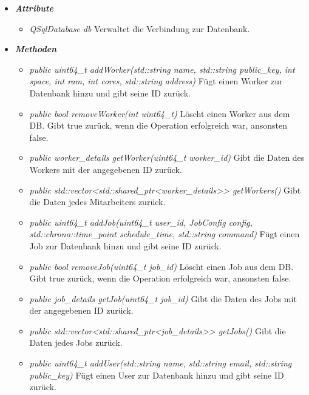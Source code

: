 \documentclass[a4paper,12pt]{article}
\begin{document}
\begin{itemize}[label={}]

	\item \textit{\textbf{Attribute}}
		\begin{itemize}[label={\textbullet}]
			\item \textit{QSqlDatabase db} Verwaltet die Verbindung zur Datenbank. 
		\end{itemize}

	\item \textit{\textbf{Methoden}}
		\begin{itemize}[label={\textbullet}]
			\item \textit{public uint64\_t addWorker(std::string name, std::string public\_key, int space, int ram, int cores, std::string address)} Fügt einen Worker zur Datenbank hinzu und gibt seine ID zurück.
				
				\item \textit{public bool removeWorker(int uint64\_t)} Löscht einen Worker aus dem DB. Gibt true zurück, wenn die Operation erfolgreich war, ansonsten false.
				
				\item \textit{public worker\_details getWorker(uint64\_t worker\_id)} Gibt die Daten des Workers mit der angegebenen ID zurück.
				
				\item \textit{public std::vector<std::shared\_ptr<worker\_details>> getWorkers()} Gibt die Daten jedes Mitarbeiters zurück.
				
				\item \textit{public uint64\_t addJob(uint64\_t user\_id, JobConfig config, std::chrono::time\_point schedule\_time, std::string command)} Fügt einen Job zur Datenbank hinzu und gibt seine ID zurück. 
				
				\item \textit{public bool removeJob(uint64\_t job\_id)} Löscht einen Job aus dem DB. Gibt true zurück, wenn die Operation erfolgreich war, ansonsten false.
				
				\item \textit{public job\_details getJob(uint64\_t job\_id)} Gibt die Daten des Jobs mit der angegebenen ID zurück.
				
				\item \textit{public std::vector<std::shared\_ptr<job\_details>> getJobs()} Gibt die Daten jedes Jobs zurück.
				
				\item \textit{public uint64\_t addUser(std::string name, std::string email, std::string public\_key)} Fügt einen User zur Datenbank hinzu und gibt seine ID zurück. 
				

\end{itemize}
\end{itemize}
\end{document}
